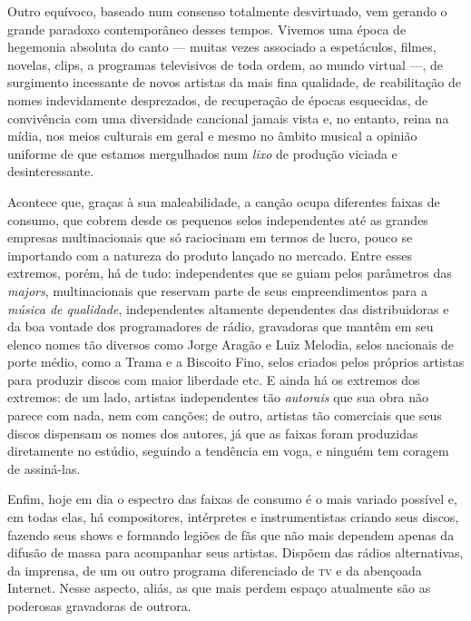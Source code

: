 Outro equívoco, baseado num consenso totalmente desvirtuado, vem gerando
o grande paradoxo contemporâneo desses tempos. Vivemos uma época de
hegemonia absoluta do canto --- muitas vezes associado a espetáculos,
filmes, novelas, clips, a programas televisivos de toda ordem, ao mundo
virtual ---, de surgimento incessante de novos artistas da mais fina
qualidade, de reabilitação de nomes indevidamente desprezados, de
recuperação de épocas esquecidas, de convivência com uma diversidade
cancional jamais vista e, no entanto, reina na mídia, nos meios
culturais em geral e mesmo no âmbito musical a opinião uniforme de que
estamos mergulhados num \textit{lixo} de produção viciada e desinteressante.

Acontece que, graças à sua maleabilidade, a canção ocupa diferentes
faixas de consumo, que cobrem desde os pequenos selos independentes até
as grandes empresas multinacionais que só raciocinam em termos de lucro,
pouco se importando com a natureza do produto lançado no mercado. Entre
esses extremos, porém, há de tudo: independentes que se guiam pelos
parâmetros das \emph{majors}, multinacionais que reservam parte de seus
empreendimentos para a \textit{música de qualidade}, independentes
altamente dependentes das distribuidoras e da boa vontade dos
programadores de rádio, gravadoras que mantêm em seu elenco nomes tão
diversos como Jorge Aragão e Luiz Melodia, selos nacionais de porte
médio, como a Trama e a Biscoito Fino, selos criados pelos próprios
artistas para produzir discos com maior liberdade etc. E ainda há os
extremos dos extremos: de um lado, artistas independentes tão
\textit{autorais} que sua obra não parece com nada, nem com canções; de
outro, artistas tão comerciais que seus discos dispensam os nomes dos
autores, já que as faixas foram produzidas diretamente no estúdio,
seguindo a tendência em voga, e ninguém tem coragem de assiná-las.

Enfim, hoje em dia o espectro das faixas de consumo é o mais variado
possível e, em todas elas, há compositores, intérpretes e
instrumentistas criando seus discos, fazendo seus shows e formando
legiões de fãs que não mais dependem apenas da difusão de massa para
acompanhar seus artistas. Dispõem das rádios alternativas, da imprensa,
de um ou outro programa diferenciado de \textsc{tv} e da abençoada Internet.
Nesse aspecto, aliás, as que mais perdem espaço atualmente são as
poderosas gravadoras de outrora.

